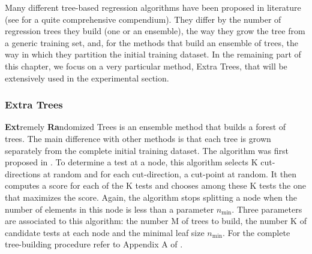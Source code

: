 			\noindent Many different tree-based regression algorithms have been proposed in literature (see \cite{ernst2005tree} for a quite comprehensive compendium).
			They differ by the number of regression trees they build (one or an ensemble), the way they grow the tree from a generic training set, and, for
			the methods that build an ensemble of trees, the way in which they partition the initial training dataset.\newline
			In the remaining part of this chapter, we focus on a very particular method, Extra Trees, that will be extensively used in the
			experimental section.

		\subsubsection{Extra Trees}
			\noindent \textbf{Ext}remely \textbf{Ra}ndomized Trees is an ensemble method that builds a forest of trees. The main difference with other methods is that
			each tree is grown separately from the complete initial training dataset.\newline
			The algorithm was first proposed in \cite{ernst2005tree}.\newline
			To determine a test at a node, this algorithm selects K cut-directions at random and for each cut-direction, a cut-point
			at random. It then computes a score for each of the K tests and chooses among these K tests the one that maximizes the score.
			Again, the algorithm stops splitting a node when the number of elements in this node is less than a parameter $n_{\min}$.
			Three parameters are associated to this algorithm: the number M of trees to build, the number K of candidate tests at each node and the minimal leaf size $n_{\min}$.
			For the complete tree-building procedure refer to Appendix A of \cite{ernst2005tree}.
